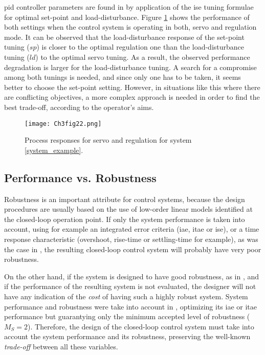 \gls{pid} controller parameters are found in \citet{zhuang1993} by application of the \gls{ise} tuning formulae for optimal set-point and load-disturbance. Figure \ref{ch3:fig:example1} shows the performance of both settings when the control system is operating in both, servo and regulation mode. It can be observed that the load-disturbance response of the set-point tuning ($sp$) is closer to the optimal regulation one than the load-disturbance tuning ($ld$) to the optimal servo tuning. As a result, the observed performance degradation is larger for the load-disturbance tuning. A search for a compromise among both tunings is needed, and since only one has to be taken, it seems better to choose the set-point setting. However, in situations like this where there are conflicting objectives, a more complex approach is needed in order to find the best trade-off, according to the operator's aims.
%
\begin{figure}[tb]
    \begin{center}
        \texttt{[image: Ch3fig22.png]}
        \caption{Process responses for servo and regulation for system \eqref{system_example}.}
        \label{ch3:fig:example1}
    \end{center}
\end{figure}
%
%
\subsection{Performance vs. Robustness}
%
Robustness is an important attribute for control systems, because the design procedures are usually based on the use of low-order linear models identified at the closed-loop operation point. If only the system performance is taken into account, using for example an integrated error criteria (\gls{iae}, \gls{itae} or \gls{ise}), or a time response characteristic (overshoot, rise-time or settling-time for example), as was the case in \citet{Huang2002, Tavakoli2003}, the resulting closed-loop control system will probably have very poor robustness.

On the other hand, if the system is designed to have good robustness, as in \citet{Hagglund2008}, and if the performance of the resulting system is not evaluated, the designer will not have any indication of the \emph{cost} of having such a highly robust system.  System performance and robustness were take into account in \citet{Shen2002, Tavakoli2005}, optimizing its \gls{iae} or \gls{itae} performance but guarantying only the minimum accepted level of robustness ($M_S=2$). Therefore, the design of the closed-loop control system must take into account the system performance and its robustness, preserving the well-known \emph{trade-off} between all these variables.


